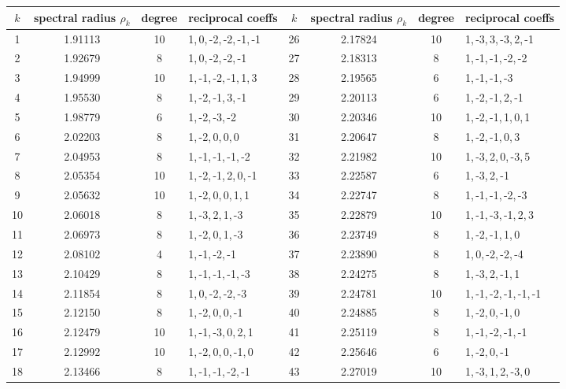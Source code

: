 \documentclass[11pt]{amsart}
\numberwithin{equation}{section}
\begin{document}
\begin{appendices}
{\footnotesize{
\begin{table}[h]
\centering
\begin{tabular}{|c|c|c|l||c|c|c|l|}
\hline
$k$ & spectral radius $\rho_k$ & degree & reciprocal coeffs  
& $k$ & spectral radius $\rho_k$ & degree & reciprocal coeffs  \\ \hline\hline
1 & 1.91113 & 10 & 1,\,0,\,-2,\,-2,\,-1,\,-1 
& 26 & 2.17824 & 10 & 1,\,-3,\,3,\,-3,\,2,\,-1 \\
2 & 1.92679 & 8 & 1,\,0,\,-2,\,-2,\,-1 
& 27 & 2.18313 & 8 & 1,\,-1,\,-1,\,-2,\,-2 \\
3 & 1.94999 & 10 & 1,\,-1,\,-2,\,-1,\,1,\,3 
& 28 & 2.19565 & 6 & 1,\,-1,\,-1,\,-3 \\
4 & 1.95530 & 8 & 1,\,-2,\,-1,\,3,\,-1 
& 29 & 2.20113 & 6 & 1,\,-2,\,-1,\,2,\,-1 \\
5 & 1.98779 & 6 & 1,\,-2,\,-3,\,-2 
& 30 & 2.20346 & 10 & 1,\,-2,\,-1,\,1,\,0,\,1 \\
6 & 2.02203 & 8 & 1,\,-2,\,0,\,0,\,0 
& 31 & 2.20647 & 8 & 1,\,-2,\,-1,\,0,\,3 \\
7 & 2.04953 & 8 & 1,\,-1,\,-1,\,-1,\,-2 
& 32 & 2.21982 & 10 & 1,\,-3,\,2,\,0,\,-3,\,5 \\
8 & 2.05354 & 10 & 1,\,-2,\,-1,\,2,\,0,\,-1 
& 33 & 2.22587 & 6 & 1,\,-3,\,2,\,-1 \\
9 & 2.05632 & 10 & 1,\,-2,\,0,\,0,\,1,\,1 
& 34 & 2.22747 & 8 & 1,\,-1,\,-1,\,-2,\,-3 \\
10 & 2.06018 & 8 & 1,\,-3,\,2,\,1,\,-3 
& 35 & 2.22879 & 10 & 1,\,-1,\,-3,\,-1,\,2,\,3 \\
11 & 2.06973 & 8 & 1,\,-2,\,0,\,1,\,-3 
& 36 & 2.23749 & 8 & 1,\,-2,\,-1,\,1,\,0 \\
12 & 2.08102 & 4 & 1,\,-1,\,-2,\,-1 
& 37 & 2.23890 & 8 & 1,\,0,\,-2,\,-2,\,-4 \\
13 & 2.10429 & 8 & 1,\,-1,\,-1,\,-1,\,-3 
& 38 & 2.24275 & 8 & 1,\,-3,\,2,\,-1,\,1 \\
14 & 2.11854 & 8 & 1,\,0,\,-2,\,-2,\,-3 
& 39 & 2.24781 & 10 & 1,\,-1,\,-2,\,-1,\,-1,\,-1 \\
15 & 2.12150 & 8 & 1,\,-2,\,0,\,0,\,-1 
& 40 & 2.24885 & 8 & 1,\,-2,\,0,\,-1,\,0 \\
16 & 2.12479 & 10 & 1,\,-1,\,-3,\,0,\,2,\,1 
& 41 & 2.25119 & 8 & 1,\,-1,\,-2,\,-1,\,-1 \\
17 & 2.12992 & 10 & 1,\,-2,\,0,\,0,\,-1,\,0 
& 42 & 2.25646 & 6 & 1,\,-2,\,0,\,-1 \\
18 & 2.13466 & 8 & 1,\,-1,\,-1,\,-2,\,-1 
& 43 & 2.27019 & 10 & 1,\,-3,\,1,\,2,\,-3,\,0 \\

\end{tabular}
\end{table}}}
\end{appendices}
\end{document}
